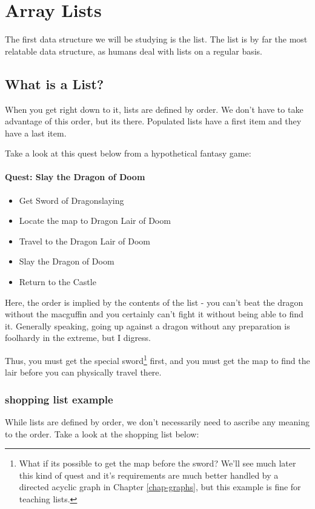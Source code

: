 

\chapter{Array Lists}
\label{chap-arraylist}
The first data structure we will be studying is the list.
The list is by far the most relatable data structure, as humans deal with lists on a regular basis.

\section{What is a List?}


When you get right down to it, lists are defined by order.
We don't have to take advantage of this order, but its there.
Populated lists have a first item and they have a last item.

Take a look at this quest below from a hypothetical fantasy game:

\subsubsection*{Quest: Slay the Dragon of Doom}
\begin{itemize}
	\item Get Sword of Dragonslaying
	\item Locate the map to Dragon Lair of Doom
	\item Travel to the Dragon Lair of Doom 
	\item Slay the Dragon of Doom
	\item Return to the Castle
\end{itemize}

Here, the order is implied by the contents of the list - you can't beat the dragon without the macguffin and you certainly can't fight it without being able to find it.
Generally speaking, going up against a dragon without any preparation is foolhardy in the extreme, but I digress.

Thus, you must get the special sword\footnote{What if its possible to get the map before the sword? We'll see much later this kind of quest and it's requirements are much better handled by a directed acyclic graph in Chapter \ref{chap-graphs}, but this example is fine for teaching lists.} first, and you must get the map to find the lair before you can physically travel there.

\subsection*{shopping list example}
While lists are defined by order, we don't necessarily  need to ascribe any meaning to the order.
Take a look at the shopping list below:




